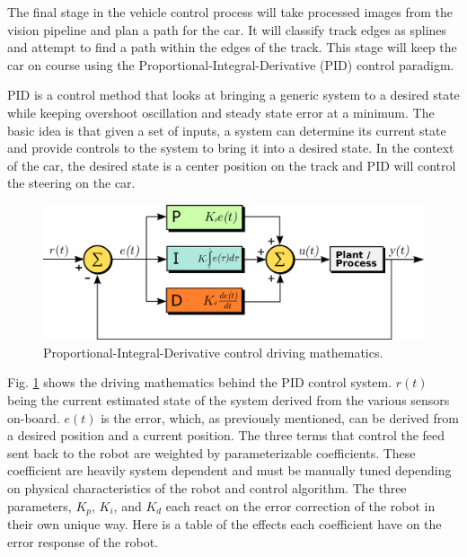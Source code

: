 \documentclass{article}
\begin{document}
The final stage in the vehicle control process will take processed images from the vision pipeline and plan a path for the car. It will classify track edges as splines and attempt to find a path within the edges of the track. This stage will keep the car on course using the Proportional-Integral-Derivative (PID) control paradigm.

PID is a control method that looks at bringing a generic system to a desired state while keeping overshoot oscillation and steady state error at a minimum. The basic idea is that given a set of inputs, a system can determine its current state and provide controls to the system to bring it into a desired state. In the context of the car, the desired state is a center position on the track and PID will control the steering on the car.

\begin{figure}[htb]
	\centering
	\centerline{\includegraphics[width=1.0\linewidth]{pid}}
	\caption{Proportional-Integral-Derivative control driving mathematics.}
	\label{fig:pid}
\end{figure}

Fig. \ref{fig:pid} shows the driving mathematics behind the PID control system. $r(t)$ being the current estimated state of the system derived from the various sensors on-board. $e(t)$ is the error, which, as previously mentioned, can be derived from a desired position and a current position. The three terms that control the feed sent back to the robot are weighted by parameterizable coefficients. These coefficient are heavily system dependent and must be manually tuned depending on physical characteristics of the robot and control algorithm. The three parameters, $K_p$, $K_i$, and $K_d$ each react on the error correction of the robot in their own unique way. Here is a table of the effects each coefficient have on the error response of the robot.
\end{document}
